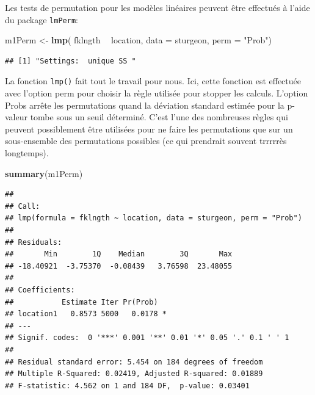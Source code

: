 \documentclass[12pt,]{book}
\newenvironment{Shaded}{\begin{snugshade}}{\end{snugshade}}
\newcommand{\DataTypeTok}[1]{\textcolor[rgb]{0.13,0.29,0.53}{#1}}
\newcommand{\KeywordTok}[1]{\textcolor[rgb]{0.13,0.29,0.53}{\textbf{#1}}}
\newcommand{\NormalTok}[1]{#1}
\newcommand{\OperatorTok}[1]{\textcolor[rgb]{0.81,0.36,0.00}{\textbf{#1}}}
\newcommand{\StringTok}[1]{\textcolor[rgb]{0.31,0.60,0.02}{#1}}
\begin{document}
Les tests de permutation pour les modèles linéaires peuvent être effectués à l'aide du package \texttt{lmPerm}:

\begin{Shaded}
\begin{Highlighting}[]
\NormalTok{m1Perm <-}\StringTok{ }\KeywordTok{lmp}\NormalTok{(}
\NormalTok{  fklngth }\OperatorTok{~}\StringTok{ }\NormalTok{location, }\DataTypeTok{data =}\NormalTok{ sturgeon,}
  \DataTypeTok{perm =} \StringTok{"Prob"}\NormalTok{)}
\end{Highlighting}
\end{Shaded}

\begin{verbatim}
## [1] "Settings:  unique SS "
\end{verbatim}

La fonction \texttt{lmp()} fait tout le travail pour nous. Ici, cette fonction est effectuée avec l'option perm pour choisir la règle utilisée pour stopper les calculs. L'option Probs arrête les permutations quand la déviation standard estimée pour la p-valeur tombe sous un seuil déterminé. C'est l'une des nombreuses règles qui peuvent possiblement être utilisées pour ne faire les permutations que sur un sous-ensemble des permutations possibles (ce qui prendrait souvent trrrrrès longtemps).

\begin{Shaded}
\begin{Highlighting}[]
\KeywordTok{summary}\NormalTok{(m1Perm)}
\end{Highlighting}
\end{Shaded}

\begin{verbatim}
## 
## Call:
## lmp(formula = fklngth ~ location, data = sturgeon, perm = "Prob")
## 
## Residuals:
##       Min        1Q    Median        3Q       Max 
## -18.40921  -3.75370  -0.08439   3.76598  23.48055 
## 
## Coefficients:
##           Estimate Iter Pr(Prob)  
## location1   0.8573 5000   0.0178 *
## ---
## Signif. codes:  0 '***' 0.001 '**' 0.01 '*' 0.05 '.' 0.1 ' ' 1
## 
## Residual standard error: 5.454 on 184 degrees of freedom
## Multiple R-Squared: 0.02419, Adjusted R-squared: 0.01889 
## F-statistic: 4.562 on 1 and 184 DF,  p-value: 0.03401
\end{verbatim}
\end{document}
